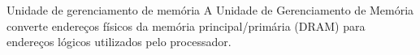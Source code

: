 




\title{\insertlecture}

\frame{\titlepage}

\begin{frame}{Unidade de gerenciamento de memória}
  \small
  A \alert{Unidade de Gerenciamento de Memória} converte endereços
  físicos da memória principal/primária (DRAM) para endereços lógicos
  utilizados pelo processador.

\bigskip


\end{frame}



